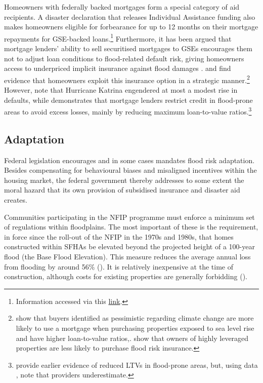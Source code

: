 \documentclass[12pt]{article}
\begin{document}
Homeowners with federally backed mortgages form a special category of aid recipients. A disaster declaration that releases Individual Assistance funding also makes homeowners eligible for forbearance for up to 12 months on their mortgage repayments for GSE-backed loans.\footnote{Information accessed via this \hyperlink{https://www.fhfa.gov/homeowners-and-homebuyers/mortgage-assistance/disaster-assistance}{link}.} Furthermore, it has been argued that mortgage lenders' ability to sell securitised mortgages to GSEs encourages them not to adjust loan conditions to flood-related default risk, giving homeowners access to underpriced implicit insurance against flood damages  \citep{keenan2020underwaterwriting,sastry2023insurers}. \cite{bakkensen2025leveraging} and \cite{liaomulder2026homeequity} find evidence that homeowners exploit this insurance option in a strategic manner.\footnote{\cite{bakkensen2025leveraging} show that buyers identified as pessimistic regarding climate change are more likely to use a mortgage when purchasing properties exposed to sea level rise and have higher loan-to-value ratios,. \cite{liaomulder2026homeequity} show that owners of highly leveraged properties are less likely to purchase flood risk insurance.} However, \cite{gallagher2017household} note that Hurricane Katrina engendered at most a modest rise in defaults, while \cite{sastry2026bears} demonstrates that mortgage lenders restrict credit in flood-prone areas to avoid excess losses, mainly by reducing maximum loan-to-value ratios.\footnote{\cite{nguyen2022climate} provide earlier evidence of reduced LTVs in flood-prone areas, but, using data , note that providers underestimate.} 


\subsection{Adaptation}

Federal legislation encourages and in some cases mandates flood risk adaptation. Besides compensating for behavioural biases and misaligned incentives within the housing market, the federal government thereby addresses to some extent the moral hazard that its own provision of subsidised insurance and disaster aid creates. 

Communities participating in the NFIP programme must enforce a minimum set of regulations within floodplains. The most important of these is the requirement, in force since the roll-out of the NFIP in the 1970s and 1980s, that homes constructed within SFHAs be elevated beyond the projected height of a 100-year flood (the Base Flood Elevation). This measure reduces the average annual loss from flooding by around 56$\%$ (\cite{ostriker2022effects}). It is relatively inexpensive at the time of construction, although costs for existing properties are generally forbidding (\cite{botzen2019adoption}).   
\end{document}
